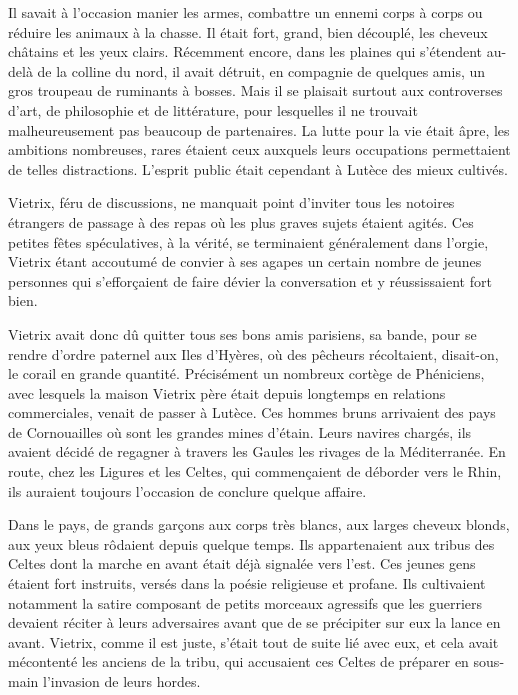 \documentclass[a4paper, 11pt, oneside, polutonikogreek, french]{article}
\begin{document}
Il savait à l'occasion manier les armes, combattre un ennemi corps à corps ou réduire les animaux à la chasse. Il était fort, grand, bien découplé, les cheveux châtains et les yeux clairs. Récemment encore, dans les plaines qui s'étendent au-delà de la colline du nord, il avait détruit, en compagnie de quelques amis, un gros troupeau de ruminants à bosses. Mais il se plaisait surtout aux controverses d'art, de philosophie et de littérature, pour lesquelles il ne trouvait malheureusement pas beaucoup de partenaires. La lutte pour la vie était âpre, les ambitions nombreuses, rares étaient ceux auxquels leurs occupations permettaient de telles distractions. L'esprit public était cependant à Lutèce des mieux cultivés.

Vietrix, féru de discussions, ne manquait point d'inviter tous les notoires étrangers de passage à des repas où les plus graves sujets étaient agités. Ces petites fêtes spéculatives, à la vérité, se terminaient généralement dans l'orgie, Vietrix étant accoutumé de convier à ses agapes un certain nombre de jeunes personnes qui s'efforçaient de faire dévier la conversation et y réussissaient fort bien.

\bigskip
\centerline{\EightStarTaper}
\centerline{\EightStarTaper\EightStarTaper}
\bigskip

Vietrix avait donc dû quitter tous ses bons amis parisiens, sa bande, pour se rendre d'ordre paternel aux Iles d'Hyères, où des pêcheurs récoltaient, disait-on, le corail en grande quantité. Précisément un nombreux cortège de Phéniciens, avec lesquels la maison Vietrix père était depuis longtemps en relations commerciales, venait de passer à Lutèce. Ces hommes bruns arrivaient des pays de Cornouailles où sont les grandes mines d'étain. Leurs navires chargés, ils avaient décidé de regagner à travers les Gaules les rivages de la Méditerranée. En route, chez les Ligures et les Celtes, qui commençaient de déborder vers le Rhin, ils auraient toujours l'occasion de conclure quelque affaire.

Dans le pays, de grands garçons aux corps très blancs, aux larges cheveux blonds, aux yeux bleus rôdaient depuis quelque temps. Ils appartenaient aux tribus des Celtes dont la marche en avant était déjà signalée vers l'est. Ces jeunes gens étaient fort instruits, versés dans la poésie religieuse et profane. Ils cultivaient notamment la satire composant de petits morceaux agressifs que les guerriers devaient réciter à leurs adversaires avant que de se précipiter sur eux la lance en avant. Vietrix, comme il est juste, s'était tout de suite lié avec eux, et cela avait mécontenté les anciens de la tribu, qui accusaient ces Celtes de préparer en sous-main l'invasion de leurs hordes.
\end{document}
